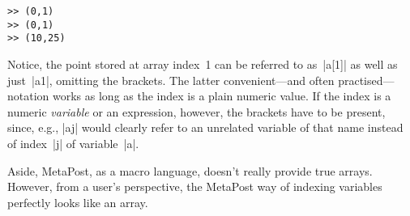\begin{lstlisting}[style=text]
>> (0,1)
>> (0,1)
>> (10,25)
\end{lstlisting}

Notice, the point stored at array index~1 can be referred to as~|a[1]|
as well as just~|a1|, omitting the brackets.  The latter
convenient---and often practised---notation works as long as the index
is a plain numeric value.  If the index is a numeric \emph{variable} or
an expression, however, the brackets have to be present, since, e.g.,
|aj| would clearly refer to an unrelated variable of that name instead
of index~|j| of variable~|a|.

Aside, MetaPost, as a macro language, doesn't really provide true arrays.
However, from a user's perspective, the MetaPost way of indexing
variables perfectly looks like an array.
